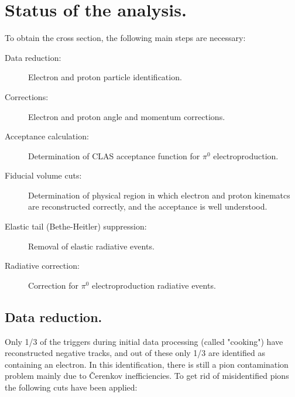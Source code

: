 \section{Status of the analysis.}

To obtain the cross section, the following main steps are necessary:

\begin{description}
\item[Data reduction:] Electron and proton particle identification.
\item[Corrections:] Electron and proton angle and momentum corrections.
\item[Acceptance calculation:] Determination of CLAS acceptance function for $\pi^0$ electroproduction.
\item[Fiducial volume cuts:] Determination of physical region in which electron and proton kinematcs are 
     reconstructed correctly, and the acceptance is well understood.
\item[Elastic tail (Bethe-Heitler) suppression:] Removal of elastic radiative events.
\item[Radiative correction:] Correction for $\pi^0$ electroproduction radiative events.
\end{description} 

\subsection{Data reduction.}
Only 1/3 of the triggers during initial data processing (called "cooking") have reconstructed 
negative tracks, and out of these only 1/3 are identified as containing an electron. 
In this identification, there is still a pion contamination problem mainly due to \v Cerenkov inefficiencies. 
To get rid of misidentified pions
the following cuts have been applied:


